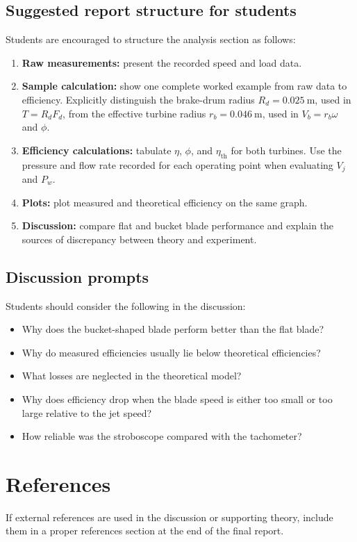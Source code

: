 \documentclass[12pt,letterpaper]{article}
\begin{document}
\subsection*{Suggested report structure for students}
Students are encouraged to structure the analysis section as follows:
\begin{enumerate}[leftmargin=*, label=\arabic*.]
    \item \textbf{Raw measurements:} present the recorded speed and load data.
    \item \textbf{Sample calculation:} show one complete worked example from raw data to efficiency. Explicitly distinguish the brake-drum radius \(R_d=0.025~\text{m}\), used in \(T=R_dF_d\), from the effective turbine radius \(r_b=0.046~\text{m}\), used in \(V_b=r_b\omega\) and \(\phi\).
    \item \textbf{Efficiency calculations:} tabulate \(\eta\), \(\phi\), and \(\eta_{\text{th}}\) for both turbines. Use the pressure and flow rate recorded for each operating point when evaluating \(V_j\) and \(P_w\).
    \item \textbf{Plots:} plot measured and theoretical efficiency on the same graph.
    \item \textbf{Discussion:} compare flat and bucket blade performance and explain the sources of discrepancy between theory and experiment.
\end{enumerate}

\subsection*{Discussion prompts}
Students should consider the following in the discussion:
\begin{itemize}[leftmargin=*]
    \item Why does the bucket-shaped blade perform better than the flat blade?
    \item Why do measured efficiencies usually lie below theoretical efficiencies?
    \item What losses are neglected in the theoretical model?
    \item Why does efficiency drop when the blade speed is either too small or too large relative to the jet speed?
    \item How reliable was the stroboscope compared with the tachometer?
\end{itemize}

\section*{References}
If external references are used in the discussion or supporting theory, include them in a proper references section at the end of the final report.
\end{document}
